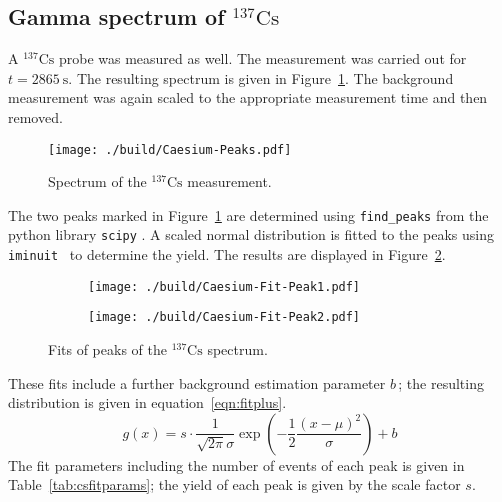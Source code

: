 \subsection{Gamma spectrum of \texorpdfstring{$^{137}\mathrm{Cs}$}{caesium}}
A $^{137}\text{Cs}$ probe was measured as well. The measurement was carried out for $t=\SI{2865}{\second}$. The
resulting spectrum is given in Figure~\ref{fig:csspectrum}. The background measurement was again scaled to the
appropriate measurement time and then removed.
\begin{figure}
	\centering
	\begin{adjustbox}{width=1.4\textwidth, center}
		\texttt{[image: ./build/Caesium-Peaks.pdf]}
	\end{adjustbox}
	\caption{Spectrum of the $^{137}\text{Cs}$ measurement.}
	\label{fig:csspectrum}
\end{figure}
\noindent
The two peaks marked in Figure~\ref{fig:csspectrum} are determined using \texttt{find\_peaks} from the python library \texttt{scipy} \cite{scipy}. A scaled normal distribution is fitted to the peaks using \texttt{iminuit}~\cite{iminuit}
to determine the yield. The results are displayed in Figure~\ref{fig:csfit}.
\begin{figure}[H]
	\centering
	\begin{adjustbox}{width=1.3\textwidth, center}
		\begin{subfigure}{.5\textwidth}
			\centering
			\texttt{[image: ./build/Caesium-Fit-Peak1.pdf]}
		\end{subfigure}%
		\begin{subfigure}{.5\textwidth}
			\centering
			\texttt{[image: ./build/Caesium-Fit-Peak2.pdf]}
		\end{subfigure}
	\end{adjustbox}
	\caption{Fits of peaks of the $^{137}\text{Cs}$ spectrum.}
	\label{fig:csfit}
\end{figure}
\noindent
These fits include a further background estimation parameter $b$\,; the resulting distribution is given in
equation~\ref{eqn:fitplus}.
\begin{equation}
	g(x) = s \cdot \frac{1}{\sqrt{2 \pi} \sigma} \exp{\left( -\frac{1}{2} \frac{(x - \mu)^{2}}{\sigma} \right)} + b
	\label{eqn:fitplus}
\end{equation}
\noindent
The fit parameters including the number of events of each peak is given in Table~\ref{tab:csfitparams}; the yield of each peak is given by the scale factor $s$.
